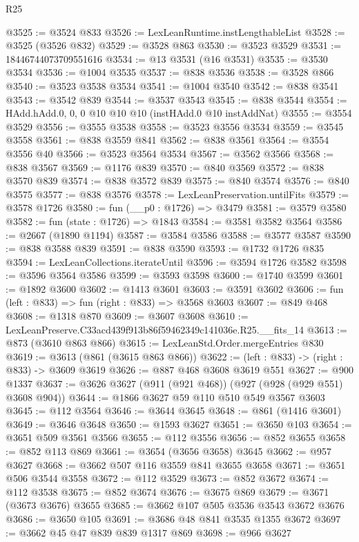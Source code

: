 \begin{lexlean}{R25}
\begin{coremodule}
@3525 := @3524 @833
@3526 := LexLeanRuntime.instLengthableList
@3528 := @3525 (@3526 @832)
@3529 := @3528 @863
@3530 := @3523 @3529
@3531 := 18446744073709551616
@3534 := @13 @3531 (@16 @3531)
@3535 := @3530 @3534
@3536 := @1004 @3535
@3537 := @838 @3536
@3538 := @3528 @866
@3540 := @3523 @3538 @3534
@3541 := @1004 @3540
@3542 := @838 @3541
@3543 := @3542 @839
@3544 := @3537 @3543
@3545 := @838 @3544
@3554 := HAdd.hAdd.{0, 0, 0} @10 @10 @10 (instHAdd.{0} @10 instAddNat)
@3555 := @3554 @3529
@3556 := @3555 @3538
@3558 := @3523 @3556 @3534
@3559 := @3545 @3558
@3561 := @838 @3559 @841
@3562 := @838 @3561
@3564 := @3554 @3556 @40
@3566 := @3523 @3564 @3534
@3567 := @3562 @3566
@3568 := @838 @3567
@3569 := @1176 @839
@3570 := @840 @3569
@3572 := @838 @3570 @839
@3574 := @838 @3572 @839
@3575 := @840 @3574
@3576 := @840 @3575
@3577 := @838 @3576
@3578 := LexLeanPreservation.untilFits
@3579 := @3578 @1726
@3580 := fun (__p0 : @1726) => @3479
@3581 := @3579 @3580
@3582 := fun (state : @1726) => @1843
@3584 := @3581 @3582 @3564
@3586 := @2667 (@1890 @1194)
@3587 := @3584 @3586
@3588 := @3577 @3587
@3590 := @838 @3588 @839
@3591 := @838 @3590
@3593 := @1732 @1726 @835
@3594 := LexLeanCollections.iterateUntil
@3596 := @3594 @1726 @3582
@3598 := @3596 @3564 @3586
@3599 := @3593 @3598
@3600 := @1740 @3599
@3601 := @1892 @3600
@3602 := @1413 @3601
@3603 := @3591 @3602
@3606 := fun (left : @833) => fun (right : @833) => @3568 @3603
@3607 := @849 @468
@3608 := @1318 @870
@3609 := @3607 @3608
@3610 := LexLeanPreserve.C33acd439f913b86f59462349c141036e.R25.__fits_14
@3613 := @873 (@3610 @863 @866)
@3615 := LexLeanStd.Order.mergeEntries @830
@3619 := @3613 (@861 (@3615 @863 @866))
@3622 := (left : @833) -> (right : @833) -> @3609 @3619
@3626 := @887 @468 @3608 @3619 @551
@3627 := @900 @1337
@3637 := @3626 @3627 (@911 (@921 @468)) (@927 (@928 (@929 @551) @3608 @904))
@3644 := @1866 @3627 @59 @110 @510 @549 @3567 @3603
@3645 := @112 @3564
@3646 := @3644 @3645
@3648 := @861 (@1416 @3601)
@3649 := @3646 @3648
@3650 := @1593 @3627
@3651 := @3650 @103
@3654 := @3651 @509 @3561 @3566
@3655 := @112 @3556
@3656 := @852 @3655
@3658 := @852 @113 @869
@3661 := @3654 (@3656 @3658) @3645
@3662 := @957 @3627
@3668 := @3662 @507 @116 @3559 @841 @3655 @3658
@3671 := @3651 @506 @3544 @3558
@3672 := @112 @3529
@3673 := @852 @3672
@3674 := @112 @3538
@3675 := @852 @3674
@3676 := @3675 @869
@3679 := @3671 (@3673 @3676) @3655
@3685 := @3662 @107 @505 @3536 @3543 @3672 @3676
@3686 := @3650 @105
@3691 := @3686 @48 @841 @3535 @1355 @3672
@3697 := @3662 @45 @47 @839 @839 @1317 @869
@3698 := @966 @3627

\end{coremodule}
\end{lexlean}

